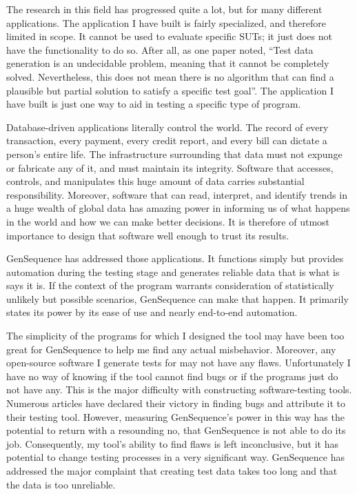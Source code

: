 The research in this field has progressed quite a lot, but for many different applications. The application I have built is fairly specialized, and therefore limited in scope. It cannot be used to evaluate specific SUTs; it just does not have the functionality to do so. After all, as one paper noted, ``Test data generation is an undecidable problem, meaning that it cannot be completely solved. Nevertheless, this does not mean there is no algorithm that can find a plausible but partial solution to satisfy a specific test goal''. The application I have built is just one way to aid in testing a specific type of program.

Database-driven applications literally control the world. The record of every transaction, every payment, every credit report, and every bill can dictate a person’s entire life. The infrastructure surrounding that data must not expunge or fabricate any of it, and must maintain its integrity. Software that accesses, controls, and manipulates this huge amount of data carries substantial responsibility. Moreover, software that can read, interpret, and identify trends in a huge wealth of global data has amazing power in informing us of what happens in the world and how we can make better decisions. It is therefore of utmost importance to design that software well enough to trust its results.

GenSequence has addressed those applications. It functions simply but provides automation during the testing stage and generates reliable data that is what is says it is. If the context of the program warrants consideration of statistically unlikely but possible scenarios, GenSequence can make that happen. It primarily states its power by its ease of use and nearly end-to-end automation.

The simplicity of the programs for which I designed the tool may have been too great for GenSequence to help me find any actual misbehavior. Moreover, any open-source software I generate tests for may not have any flaws. Unfortunately I have no way of knowing if the tool cannot find bugs or if the programs just do not have any. This is the major difficulty with constructing software-testing tools. Numerous articles have declared their victory in finding bugs and attribute it to their testing tool. However, measuring GenSequence’s power in this way has the potential to return with a resounding no, that GenSequence is not able to do its job. Consequently, my tool’s ability to find flaws is left inconclusive, but it has potential to change testing processes in a very significant way. GenSequence has addressed the major complaint that creating test data takes too long and that the data is too unreliable.

